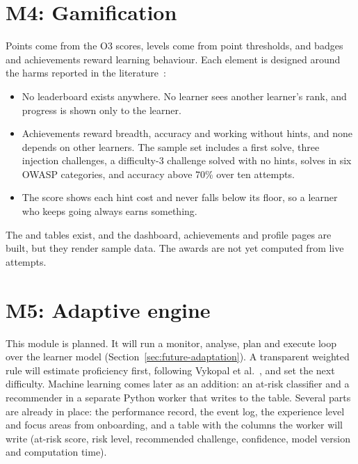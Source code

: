\section{M4: Gamification}
\label{sec:m4}

Points come from the O3 scores, levels come from point thresholds, and badges and achievements reward learning behaviour. Each element is designed around the harms reported in the literature~\cite{Toda2018dark,Almeida2023negative}:

\begin{itemize}[leftmargin=1.4em]
\item No leaderboard exists anywhere. No learner sees another learner's rank, and progress is shown only to the learner.
\item Achievements reward breadth, accuracy and working without hints, and none depends on other learners. The sample set includes a first solve, three injection challenges, a difficulty-3 challenge solved with no hints, solves in six OWASP categories, and accuracy above 70\% over ten attempts.
\item The score shows each hint cost and never falls below its floor, so a learner who keeps going always earns something.
\end{itemize}

The  and  tables exist, and the dashboard, achievements and profile pages are built, but they render sample data. The awards are not yet computed from live attempts.

\section{M5: Adaptive engine}

This module is planned. It will run a monitor, analyse, plan and execute loop over the learner model (Section~\ref{sec:future-adaptation}). A transparent weighted rule will estimate proficiency first, following Vykopal et al.~\cite{Vykopal2023smart}, and set the next difficulty. Machine learning comes later as an addition: an at-risk classifier and a recommender in a separate Python worker that writes to the  table. Several parts are already in place: the performance record, the event log, the experience level and focus areas from onboarding, and a  table with the columns the worker will write (at-risk score, risk level, recommended challenge, confidence, model version and computation time).

